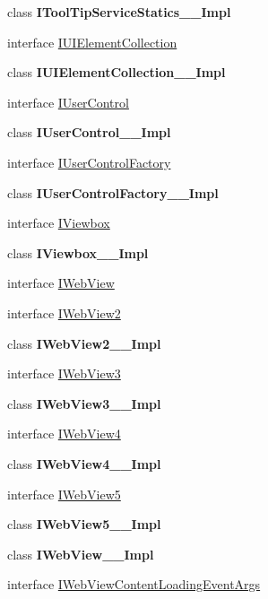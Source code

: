 \begin{DoxyCompactItemize}
\item 
class {\bfseries I\+Tool\+Tip\+Service\+Statics\+\_\+\+\_\+\+Impl}
\item 
interface \hyperlink{interface_windows_1_1_u_i_1_1_xaml_1_1_controls_1_1_i_u_i_element_collection}{I\+U\+I\+Element\+Collection}
\item 
class {\bfseries I\+U\+I\+Element\+Collection\+\_\+\+\_\+\+Impl}
\item 
interface \hyperlink{interface_windows_1_1_u_i_1_1_xaml_1_1_controls_1_1_i_user_control}{I\+User\+Control}
\item 
class {\bfseries I\+User\+Control\+\_\+\+\_\+\+Impl}
\item 
interface \hyperlink{interface_windows_1_1_u_i_1_1_xaml_1_1_controls_1_1_i_user_control_factory}{I\+User\+Control\+Factory}
\item 
class {\bfseries I\+User\+Control\+Factory\+\_\+\+\_\+\+Impl}
\item 
interface \hyperlink{interface_windows_1_1_u_i_1_1_xaml_1_1_controls_1_1_i_viewbox}{I\+Viewbox}
\item 
class {\bfseries I\+Viewbox\+\_\+\+\_\+\+Impl}
\item 
interface \hyperlink{interface_windows_1_1_u_i_1_1_xaml_1_1_controls_1_1_i_web_view}{I\+Web\+View}
\item 
interface \hyperlink{interface_windows_1_1_u_i_1_1_xaml_1_1_controls_1_1_i_web_view2}{I\+Web\+View2}
\item 
class {\bfseries I\+Web\+View2\+\_\+\+\_\+\+Impl}
\item 
interface \hyperlink{interface_windows_1_1_u_i_1_1_xaml_1_1_controls_1_1_i_web_view3}{I\+Web\+View3}
\item 
class {\bfseries I\+Web\+View3\+\_\+\+\_\+\+Impl}
\item 
interface \hyperlink{interface_windows_1_1_u_i_1_1_xaml_1_1_controls_1_1_i_web_view4}{I\+Web\+View4}
\item 
class {\bfseries I\+Web\+View4\+\_\+\+\_\+\+Impl}
\item 
interface \hyperlink{interface_windows_1_1_u_i_1_1_xaml_1_1_controls_1_1_i_web_view5}{I\+Web\+View5}
\item 
class {\bfseries I\+Web\+View5\+\_\+\+\_\+\+Impl}
\item 
class {\bfseries I\+Web\+View\+\_\+\+\_\+\+Impl}
\item 
interface \hyperlink{interface_windows_1_1_u_i_1_1_xaml_1_1_controls_1_1_i_web_view_content_loading_event_args}{I\+Web\+View\+Content\+Loading\+Event\+Args}
\item 

\end{DoxyCompactItemize}
